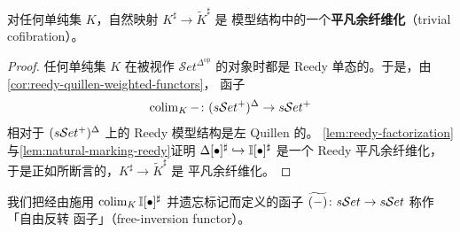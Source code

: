 \begin{proposition}\label{prop:free-inversion-trivial-cofibration}
对任何单纯集 $K$，自然映射 $K^{\sharp}\to\tilde{K}^{\sharp}$ 是\trVerity{}%
模型结构中的一个\textbf{平凡余纤维化}（trivial cofibration）。
\end{proposition}

\begin{proof}
任何单纯集 $K$ 在被视作 $\mathcal{S}et^{\Delta^{\mathrm{op}}}$ 的对象时都是
Reedy 单态的。于是，由\cref{cor:reedy-quillen-weighted-functors}，%
\trWeightedColimit{}函子
\[
\operatorname{colim}_{K}-\colon(s\mathcal{S}et^{+})^{\Delta}\to s\mathcal{S}et^{+}
\]
相对于 $(s\mathcal{S}et^{+})^{\Delta}$ 上的 Reedy 模型结构是左 Quillen 的。%
\cref{lem:reedy-factorization}与\cref{lem:natural-marking-reedy}证明
$\Delta[\bullet]^{\sharp}\hookrightarrow\mathbb{I}[\bullet]^{\sharp}$ 是一个
Reedy 平凡余纤维化，于是正如所断言的，$K^{\sharp}\to\tilde{K}^{\sharp}$ 是
平凡余纤维化。
\end{proof}

我们把经由施用\trWeightedColimit{} $\operatorname{colim}_{K}\mathbb{I}[\bullet]^{\sharp}$
并遗忘标记而定义的函子 $\widetilde{(-)}\colon s\mathcal{S}et\to s\mathcal{S}et$ 称作「自由反转
函子」（free-inversion functor）。

